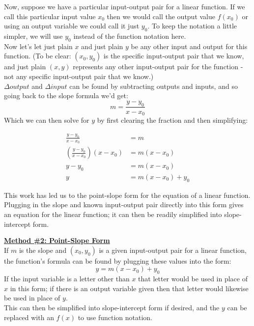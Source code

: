 Now, suppose we have a particular input-output pair for a linear function. If we call this particular input value $x_0$ then we would call the output value $f(x_0)$ or using an output variable we could call it just $y_0$. To keep the notation a little simpler, we will use $y_0$ instead of the function notation here.\\

Now let’s let just plain $x$ and just plain $y$ be any other input and output for this function. (To be clear: $(x_0,y_0)$ is the specific input-output pair that we know, and just plain $(x,y)$ represents any other input-output pair for the function - not any specific input-output pair that we know.)\\

$\Delta output$ and $\Delta input$ can be found by subtracting outputs and inputs, and so going back to the slope formula we’d get:  $$m=\frac{y-y_0}{x-x_0}$$
Which we can then solve for $y$ by first clearing the fraction and then simplifying:

\begin{align*}
	\frac{y-y_0}{x-x_0}&=m\\
	\left( \frac{y-y_0}{x-x_0} \right)(x-x_0) &= m(x-x_0)\\
	y-y_0&=m(x-x_0)\\
	y&=m(x-x_0)+y_0
\end{align*}

This work has led us to the point-slope form for the equation of a linear function. Plugging in the slope and known input-output pair directly into this form gives an equation for the linear function; it can then be readily simplified into slope-intercept form.

\begin{definition}
	\textbf{\underline{Method \#2: Point-Slope Form}}\\
	\bigskip
	If $m$ is the slope and $(x_0,y_0)$ is a given input-output pair for a linear function, the function’s formula can be found by plugging these values into the form:  $$y=m(x-x_0)+y_0$$
	If the input variable is a letter other than $x$ that letter would be used in place of $x$ in this form; if there is an output variable given then that letter would likewise be used in place of $y$.\\
	\bigskip
	This can then be simplified into slope-intercept form if desired, and the $y$ can be replaced with an $f(x)$ to use function notation.
\end{definition}

